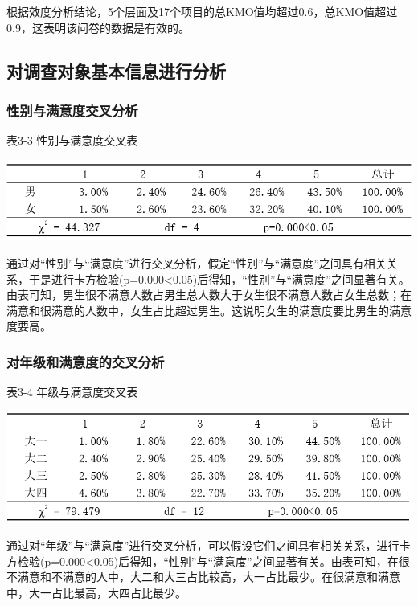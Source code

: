 \documentclass[UTF8,a4paper,12pt]{ctexart}  %
\begin{document}
根据效度分析结论，5个层面及17个项目的总KMO值均超过0.6，总KMO值超过0.9，这表明该问卷的数据是有效的。

\hypertarget{section-23}{%
\subsection{对调查对象基本信息进行分析}\label{section-23}}

\hypertarget{section-24}{%
\subsubsection{性别与满意度交叉分析}\label{section-24}}

表3-3 性别与满意度交叉表

\includegraphics{id3_3.png}

通过对``性别''与``满意度''进行交叉分析，假定``性别''与``满意度''之间具有相关关系，于是进行卡方检验(p=0.000\textless0.05)后得知，``性别''与``满意度''之间显著有关。由表可知，男生很不满意人数占男生总人数大于女生很不满意人数占女生总数；在满意和很满意的人数中，女生占比超过男生。这说明女生的满意度要比男生的满意度要高。

\hypertarget{section-25}{%
\subsubsection{对年级和满意度的交叉分析}\label{section-25}}

表3-4 年级与满意度交叉表

\includegraphics{id3_4.png}

通过对``年级''与``满意度''进行交叉分析，可以假设它们之间具有相关关系，进行卡方检验(p=0.000\textless0.05)后得知，``性别''与``满意度''之间显著有关。由表可知，在很不满意和不满意的人中，大二和大三占比较高，大一占比最少。在很满意和满意中，大一占比最高，大四占比最少。
\end{document}
